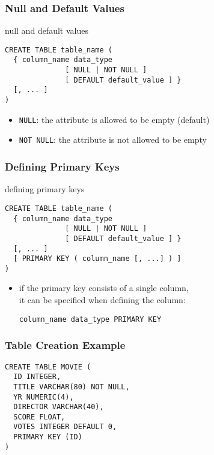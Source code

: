 \documentclass[dvipsnames]{beamer}
\theoremstyle{plain}
\begin{document}
\begin{frame}[fragile]
  \frametitle{Null and Default Values}

  \begin{block}{null and default values}
    \begin{lstlisting}
CREATE TABLE table_name (
  { column_name data_type
              [ NULL | NOT NULL ]
              [ DEFAULT default_value ] }
  [, ... ]
)
    \end{lstlisting}
  \end{block}

  \pause
  \begin{itemize}
    \item \texttt{NULL}: the attribute is allowed to be empty (default)
    \item \texttt{NOT NULL}: the attribute is not allowed to be empty
  \end{itemize}
\end{frame}

\begin{frame}[fragile]
  \frametitle{Defining Primary Keys}

  \begin{block}{defining primary keys}
    \begin{lstlisting}
CREATE TABLE table_name (
  { column_name data_type
              [ NULL | NOT NULL ]
              [ DEFAULT default_value ] }
  [, ... ]
  [ PRIMARY KEY ( column_name [, ...] ) ]
)
    \end{lstlisting}
  \end{block}

  \pause
  \begin{itemize}
    \item if the primary key consists of a single column,\\
      it can be specified when defining the column:
      \begin{lstlisting}
column_name data_type PRIMARY KEY
      \end{lstlisting}
  \end{itemize}
\end{frame}

\begin{frame}[fragile]
  \frametitle{Table Creation Example}

  \begin{example}
    \begin{lstlisting}
CREATE TABLE MOVIE (
  ID INTEGER,
  TITLE VARCHAR(80) NOT NULL,
  YR NUMERIC(4),
  DIRECTOR VARCHAR(40),
  SCORE FLOAT,
  VOTES INTEGER DEFAULT 0,
  PRIMARY KEY (ID)
)
    \end{lstlisting}
  \end{example}
\end{frame}
\end{document}
